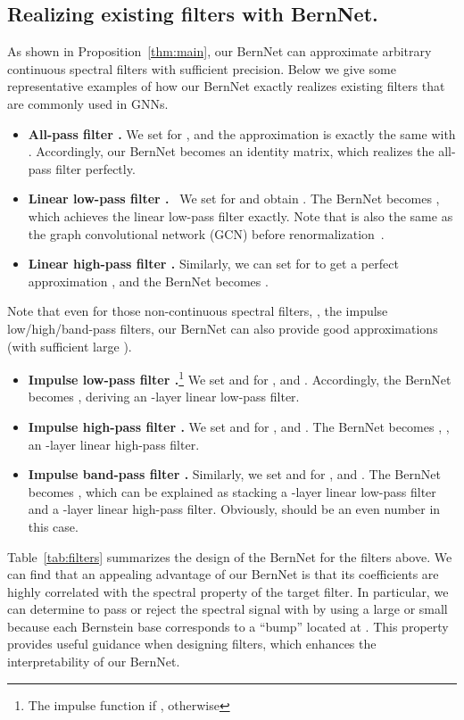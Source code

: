 \documentclass{article}
\begin{document}
\subsection{Realizing existing filters with BernNet.}
As shown in Proposition~\ref{thm:main}, our BernNet can approximate arbitrary continuous spectral filters with sufficient precision. 
Below we give some representative examples of how our BernNet exactly realizes existing filters that are commonly used in GNNs.
\begin{itemize}
    \item {\bf All-pass filter .} 
    We set  for , and the approximation  is exactly the same with .
    Accordingly, our BernNet becomes an identity matrix, which realizes the all-pass filter perfectly.


\item {\bf Linear low-pass filter .}  
    \
    We set  for  and obtain . 
    The BernNet becomes
    , which achieves the linear low-pass filter exactly. 
    Note that  is also the same as the graph convolutional network (GCN) before renormalization~\cite{kipf2016semi}.


    \item {\bf Linear high-pass filter .} 
    Similarly, we can set  for  to get a perfect approximation , and the BernNet becomes .
\end{itemize}

Note that even for those non-continuous spectral filters, , the impulse low/high/band-pass filters, our BernNet can also provide good approximations (with sufficient large ).
\begin{itemize}
    \item {\bf Impulse low-pass filter .}\footnote[2]{The impulse function  if , otherwise }
    We set  and  for , and .
    Accordingly, the BernNet becomes , deriving an -layer linear low-pass filter.
\item {\bf Impulse high-pass filter .} 
    We set  and  for , and . 
    The BernNet becomes , , an -layer linear high-pass filter.
\item {\bf Impulse band-pass filter .} 
    Similarly, we set  and  for , and .
    The BernNet becomes , which can be explained as stacking a -layer linear low-pass filter and a -layer linear high-pass filter.
    Obviously,  should be an even number in this case.
\end{itemize}




Table~\ref{tab:filters} summarizes the design of the BernNet for the filters above. 
We can find that an appealing advantage of our BernNet is that its coefficients are highly correlated with the spectral property of the target filter. 
In particular, we can determine to pass or reject the spectral signal with  by using a large or small  because each Bernstein base  corresponds to a ``bump'' located at . 
This property provides useful guidance when designing filters, which enhances the interpretability of our BernNet. 
\end{document}
